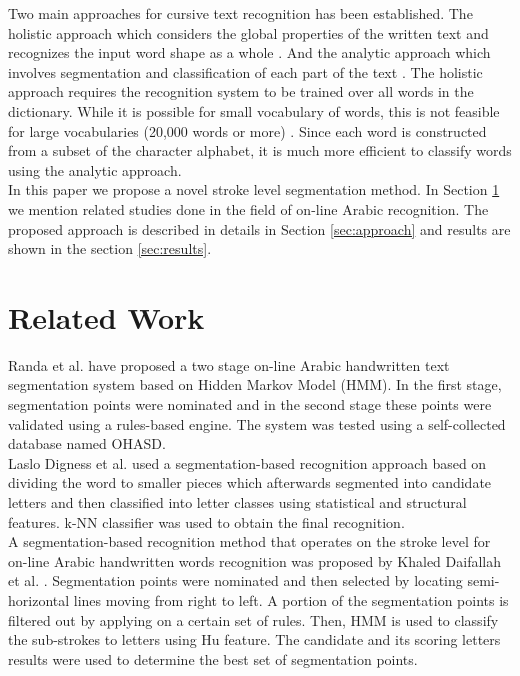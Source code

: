 \documentclass[journal,compsoc]{IEEEtran}
\begin{document}
Two main approaches for cursive text recognition has been established. The holistic approach which considers the global properties of the written text and recognizes the input word shape as a whole \cite{biadsy2011segmentation, saabni2009hierarchical}. And the analytic approach which involves segmentation and classification of each part of the text \cite{abdulla2008off, sari2002off, Dinges2011}. The holistic approach requires the recognition system to be trained over all words in the dictionary. While it is possible for small vocabulary of words, this is not feasible for large vocabularies (20,000 words or more) \cite{elanwar2012unconstrained}. Since each word is constructed from a subset of the character alphabet, it is much more efficient to classify words using the analytic approach.\\

In this paper we propose a novel stroke level segmentation method. In Section \ref{sec:related_work} we mention related studies done in the field of on-line Arabic recognition. The proposed approach is described in details in Section \ref{sec:approach} and results are shown in the section \ref{sec:results}. 

\section{Related Work}
\label{sec:related_work}

Randa et al. \cite{elanwar2012unconstrained} have proposed a two stage on-line Arabic handwritten text segmentation system based on Hidden Markov Model (HMM). In the first stage, segmentation points were nominated and in the second stage these points were validated using a rules-based engine. The system was tested using a self-collected database named OHASD.\\

Laslo Digness et al. \cite{Dinges2011} used a segmentation-based recognition approach based on dividing the word to smaller pieces which afterwards segmented into candidate letters and then classified into letter classes using statistical and structural features. k-NN classifier was used to obtain the final recognition.\\

A segmentation-based recognition method that operates on the stroke level for on-line Arabic handwritten words recognition was proposed by Khaled Daifallah et al. \cite{daifallah2009recognition}. Segmentation points were nominated and then selected by locating semi-horizontal lines moving from right to left. A portion of the segmentation points is filtered out by applying on a certain set of rules. Then, HMM is used to classify the sub-strokes to letters using Hu feature. The candidate and its scoring letters results were used to determine the best set of segmentation points.\\
\end{document}
